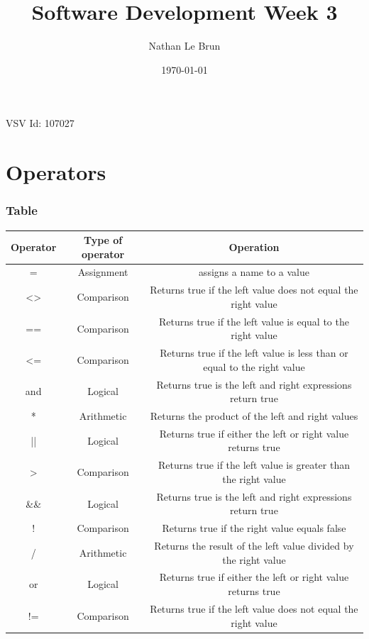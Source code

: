 \documentclass{article}
\title{Software Development Week 3}
\author{Nathan Le Brun}
\date{\today}
\begin{document}
    \maketitle
    VSV Id: 107027
    
    \section{Operators}
        \subsubsection{Table}
            \begin{tabular}{|c|c|c|}
                \hline
                Operator & Type of operator & Operation \\
                \hline
                = & Assignment & assigns a name to a value \\
                \hline
                <> & Comparison & Returns true if the left value does not equal the right value \\
                \hline
                == & Comparison & Returns true if the left value is equal to the right value \\
                \hline
                <= & Comparison & Returns true if the left value is less than or equal to the right value \\
                \hline
                and & Logical & Returns true is the left and right expressions return true \\
                \hline
                * & Arithmetic & Returns the product of the left and right values \\
                \hline
                || & Logical & Returns true if either the left or right value returns true \\
                \hline
                > & Comparison & Returns true if the left value is greater than the right value \\
                \hline
                \&\& & Logical & Returns true is the left and right expressions return true \\
                \hline
                ! & Comparison & Returns true if the right value equals false \\
                \hline
                / & Arithmetic & Returns the result of the left value divided by the right value \\
                \hline
                or & Logical & Returns true if either the left or right value returns true \\
                \hline
                != & Comparison & Returns true if the left value does not equal the right value \\
                \hline
            \end{tabular}
\end{document}
